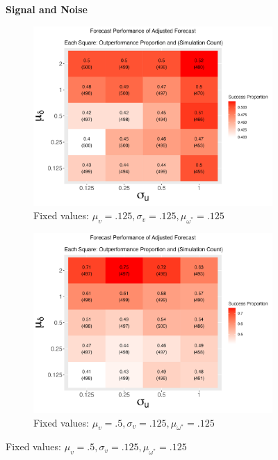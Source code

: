 \documentclass[11pt,3p,review,authoryear]{elsarticle}
\theoremstyle{definition}
\begin{document}
    \begin{figure}[!h]
      \centering
      \textbf{Signal and Noise}\par\medskip
    \begin{subfigure}{.44\linewidth} 
      \centering
        \includegraphics[scale = .42]{simulation_plots/Aug28_224311_2024_mu[delta]_sigma[u].png}
        \caption{Fixed values: $\mu_{v} = .125, \sigma_{v} = .125, \mu_{\omega^{*}} = .125$}\label{fig:sim_1}
    \end{subfigure}\hspace{12mm} %
    \begin{subfigure}{.44\linewidth} 
      \centering
        \includegraphics[scale=.42]{simulation_plots/Aug28_224317_2024_mu[delta]_sigma[u].png}
        \caption{Fixed values: $\mu_{v} = .5, \sigma_{v} = .125, \mu_{\omega^{*}} = .125$}\label{fig:sim_2}
    \end{subfigure}


\end{figure}
\end{document}
